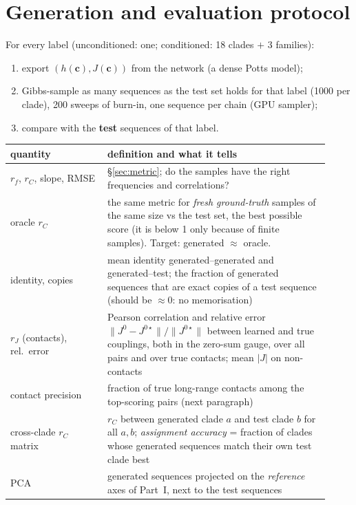 \section{Generation and evaluation protocol}\label{sec:evalprotocol}
For every label (unconditioned: one; conditioned: 18 clades $+$ 3 families):
\begin{enumerate}[nosep]
\item export $(h(\bm c),J(\bm c))$ from the network (a dense Potts model);
\item Gibbs-sample as many sequences as the test set holds for that label (1000 per clade), 200 sweeps of
      burn-in, one sequence per chain (GPU sampler);
\item compare with the \textbf{test} sequences of that label.
\end{enumerate}
\begin{center}\small
\begin{tabular}{p{0.28\linewidth}p{0.64\linewidth}}
\toprule
quantity & definition and what it tells\\
\midrule
$r_f$, $r_C$, slope, RMSE & \S\ref{sec:metric}; do the samples have the right frequencies and correlations?\\
oracle $r_C$ & the same metric for \emph{fresh ground-truth} samples of the same size vs the test set, the best
possible score (it is below 1 only because of finite samples). Target: generated $\approx$ oracle.\\
identity, copies & mean identity generated--generated and generated--test; the fraction of generated sequences
that are exact copies of a test sequence (should be $\approx0$: no memorisation)\\
$r_J$ (contacts), rel.\ error & Pearson correlation and relative error $\|J^0-J^{0\star}\|/\|J^{0\star}\|$ between learned
and true couplings, both in the zero-sum gauge, over all pairs and over true contacts; mean $|J|$ on non-contacts\\
contact precision & fraction of true long-range contacts among the top-scoring pairs (next paragraph)\\
cross-clade $r_C$ matrix & $r_C$ between generated clade $a$ and test clade $b$ for all $a,b$; \emph{assignment
accuracy} = fraction of clades whose generated sequences match their own test clade best\\
PCA & generated sequences projected on the \emph{reference} axes of Part~I, next to the test sequences\\
\bottomrule
\end{tabular}
\end{center}


